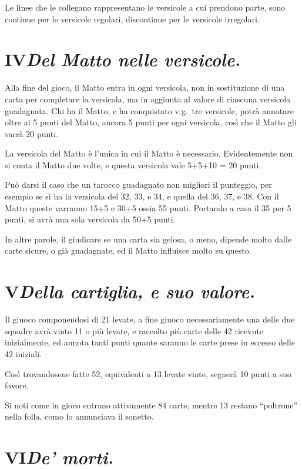 \documentclass[11pt,a6paper]{article}
\begin{document}
Le linee che le collegano rappresentano le versicole a cui prendono parte,
sono continue per le versicole regolari, discontinue per le versicole
irregolari.



\section{IV\hfill{\large\mdseries\slshape Del Matto nelle versicole.}}

Alla fine del gioco, il Matto entra in ogni versicola, non in sostituzione
di una carta per completare la versicola, ma in aggiunta al valore di
ciascuna versicola guadagnata.  Chi ha il Matto, e ha conquistato v.g.\ tre
versicole, potrà annotare oltre ai 5 punti del Matto, ancora 5 punti per
ogni versicola, così che il Matto gli varrà 20 punti.

La versicola del Matto è l'unica in cui il Matto è necessario.
Evidentemente non si conta il Matto due volte, e questa versicola vale
5+5+10 = 20 punti.

Può darsi il caso che un tarocco guadagnato non migliori il punteggio, per
esempio se si ha la versicola del 32, 33, e 34, e quella del 36, 37, e 38.
Con il Matto queste varranno 15+5 e 30+5 ossia 55 punti.  Portando a casa il
35 per 5 punti, si avrà una sola versicola da 50+5 punti.

In altre parole, il giudicare se una carta sia gelosa, o meno, dipende molto
dalle carte sicure, o già guadagnate, ed il Matto influisce molto su questo.

\section{V\hfill{\large\mdseries\slshape Della cartiglia, e suo valore.}}

Il giuoco componendosi di 21 levate, a fine giuoco necessariamente una delle
due squadre avrà vinto 11 o più levate, e raccolto più carte delle 42
ricevute inizialmente, ed annota tanti punti quante saranno le carte prese
in eccesso delle 42 iniziali.

Così
trovandosene fatte 52, equivalenti a 13 levate vinte, segnerà 10 punti a suo
favore.

Si noti come in gioco entrano attivamente 84 carte, mentre 13 restano
``poltrone'' nella folla, como lo annunciava il sonetto.


\section{VI\hfill{\large\mdseries\slshape De' morti.}}
\end{document}
